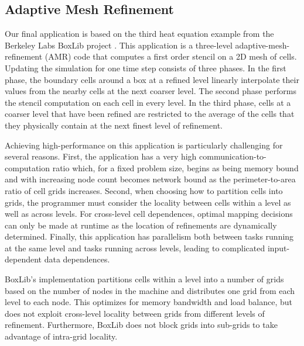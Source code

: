 \subsection{Adaptive Mesh Refinement}
\label{subsec:exp_amr}
Our final application is based on the third heat equation example from
the Berkeley Labs BoxLib project \cite{BoxLib}.  This application is a
three-level adaptive-mesh-refinement (AMR) code that computes a first
order stencil on a 2D mesh of cells.  
Updating the simulation for one time step consists of
three phases.  In the first phase, the boundary cells around a box at
a refined level linearly interpolate their values from the nearby
cells at the next coarser level.  The second phase performs the
stencil computation on each cell in every level.  In the third phase,
cells at a coarser level that have been refined are restricted to the
average of the cells that they physically contain at the next finest
level of refinement.

Achieving high-performance on this application is particularly
challenging for several reasons.  First, the application has a very
high communication-to-computation ratio which, for a fixed problem
size, begins as being memory bound and with increasing node count
becomes network bound as the perimeter-to-area ratio of cell grids
increases.  Second, when choosing how to partition cells into grids,
the programmer must consider the locality between cells within a
level as well as across levels.  For
cross-level cell dependences, optimal mapping decisions can only be made at
runtime as the location of refinements are dynamically determined.
Finally, this application has parallelism both
between tasks running at the same level and tasks running across
levels, leading to complicated input-dependent data dependences.

BoxLib's implementation partitions cells within a level 
into a number of grids based on the number of nodes in the
machine and distributes one grid from each level to each node.  This
optimizes for memory bandwidth and load balance, but does not 
exploit cross-level locality between grids from
different levels of refinement.  Furthermore, BoxLib does not block
grids into sub-grids to take advantage of intra-grid locality.

